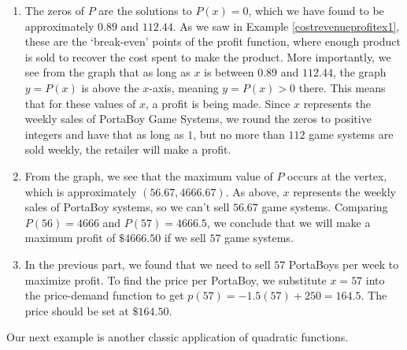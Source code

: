 {\begin{enumerate}
\item  The zeros of $P$ are the solutions to $P(x)=0$, which we have found to be approximately $0.89$ and $112.44$.  As we saw in Example \ref{costrevenueprofitex1}, these are the `break-even' points of the profit function, where enough product is sold to recover the cost spent to make the product.  More importantly, we see from the graph that as long as $x$ is between $0.89$ and $112.44$, the graph $y=P(x)$ is above the $x$-axis, meaning $y = P(x) > 0$ there.  This means that for these values of $x$, a profit is being made.  Since $x$ represents the weekly sales of PortaBoy Game Systems, we round the zeros to positive integers and have that as long as $1$, but no more than $112$ game systems are sold weekly, the retailer will make a profit.

\item  From the graph, we see that the maximum value of $P$ occurs at the vertex, which is approximately $(56.67,4666.67)$.  As above, $x$ represents the weekly sales of PortaBoy systems, so we can't sell $56.67$ game systems.  Comparing $P(56) = 4666$ and $P(57)=4666.5$, we conclude that we will make a maximum profit of $\$ 4666.50$ if we sell $57$ game systems.

\item  In the previous part, we found that we need to sell $57$ PortaBoys per week to maximize profit.  To find the price per PortaBoy, we substitute $x=57$ into the price-demand function to get  $p(57) = -1.5(57)+250 = 164.5$.   The price should be set at $\$164.50$. 

\end{enumerate}
}

\medskip

Our next example is another classic application of quadratic functions.

\pagebreak

